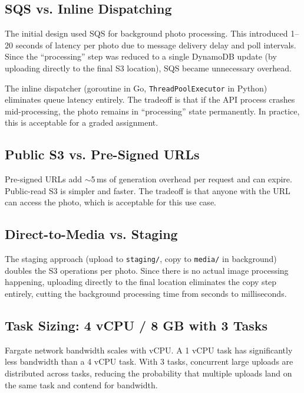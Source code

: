 \documentclass[11pt]{article}
\begin{document}
\subsection{SQS vs. Inline Dispatching}

The initial design used SQS for background photo processing. This introduced 1--20 seconds of latency per photo due to message delivery delay and poll intervals. Since the ``processing'' step was reduced to a single DynamoDB update (by uploading directly to the final S3 location), SQS became unnecessary overhead.

The inline dispatcher (goroutine in Go, \texttt{ThreadPoolExecutor} in Python) eliminates queue latency entirely. The tradeoff is that if the API process crashes mid-processing, the photo remains in ``processing'' state permanently. In practice, this is acceptable for a graded assignment.

\subsection{Public S3 vs. Pre-Signed URLs}

Pre-signed URLs add $\sim$5\,ms of generation overhead per request and can expire. Public-read S3 is simpler and faster. The tradeoff is that anyone with the URL can access the photo, which is acceptable for this use case.

\subsection{Direct-to-Media vs. Staging}

The staging approach (upload to \texttt{staging/}, copy to \texttt{media/} in background) doubles the S3 operations per photo. Since there is no actual image processing happening, uploading directly to the final location eliminates the copy step entirely, cutting the background processing time from seconds to milliseconds.

\subsection{Task Sizing: 4 vCPU / 8 GB with 3 Tasks}

Fargate network bandwidth scales with vCPU. A 1 vCPU task has significantly less bandwidth than a 4 vCPU task. With 3 tasks, concurrent large uploads are distributed across tasks, reducing the probability that multiple uploads land on the same task and contend for bandwidth.
\end{document}

